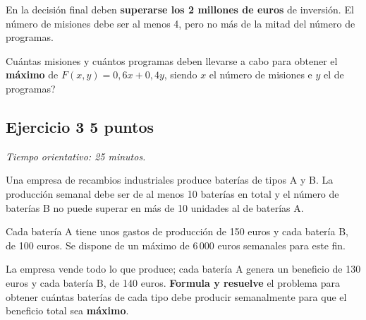 \documentclass[12pt]{article}
\begin{document}
En la decisión final deben \textbf{superarse los 2 millones de euros} de inversión. El número de misiones debe ser al menos 4, pero no más de la mitad del número de programas.

\textquestiondown{}Cuántas misiones y cuántos programas deben llevarse a cabo para obtener el \textbf{máximo} de $F(x,y)=0{,}6x+0{,}4y$, siendo $x$ el número de misiones e $y$ el de programas?
\subsection*{Ejercicio 3 \hfill 5 puntos}
\textit{Tiempo orientativo: 25 minutos.}

Una empresa de recambios industriales produce baterías de tipos A y B. La producción semanal debe ser de al menos 10 baterías en total y el número de baterías B no puede superar en más de 10 unidades al de baterías A.

Cada batería A tiene unos gastos de producción de 150 euros y cada batería B, de 100 euros. Se dispone de un máximo de 6\,000 euros semanales para este fin.

La empresa vende todo lo que produce; cada batería A genera un beneficio de 130 euros y cada batería B, de 140 euros. \textbf{Formula y resuelve} el problema para obtener cuántas baterías de cada tipo debe producir semanalmente para que el beneficio total sea \textbf{máximo}.
\end{document}
